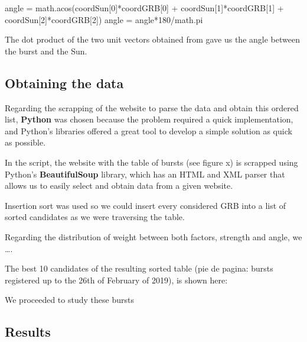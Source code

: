 \documentclass[12pt]{article}
\begin{document}
angle = math.acos(coordSun[0]*coordGRB[0] + coordSun[1]*coordGRB[1] + coordSun[2]*coordGRB[2])
angle = angle*180/math.pi


The dot product of the two unit vectors obtained from gave us the angle between the burst and the Sun.





\subsection{Obtaining the data}

Regarding the scrapping of the website to parse the data and obtain this ordered list, \textbf{Python} was chosen because the problem required a quick implementation, and Python’s libraries offered a great tool to develop a simple solution as quick as possible.

In the script, the website with the table of bursts (see figure x) is scrapped using Python’s \textbf{BeautifulSoup} library, which has an HTML and XML parser that allows us to easily select and obtain data from a given website.

Insertion sort was used so we could insert every considered GRB into a list of sorted candidates as we were traversing the table. 



Regarding the distribution of weight between both factors, strength and angle, we ….

The best 10 candidates of the resulting sorted table (pie de pagina: bursts registered up to the 26th of February of 2019), is shown here:

We proceeded to study these bursts

\subsection{Results}


\newpage


\end{document}
